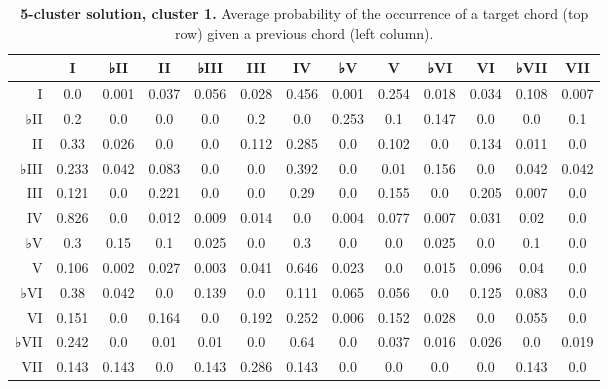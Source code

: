 \begin{table}[htbp]
\begin{minipage}{\linewidth}
\setlength{\tymax}{0.5\linewidth}
\centering
\small
\caption{\textbf{5-cluster solution, cluster 1.} Average probability of the occurrence of a target chord (top row) given a previous chord (left column).}
\label{5-clustersolutioncluster1.averageprobabilityoftheoccurrenceofatargetchordtoprowgivenapreviouschordleftcolumn.}
\begin{tabulary}{\textwidth}{@{}RCCCCCCCCCCCC@{}} \toprule
&I&♭II&II&♭III&III&IV&♭V&V&♭VI&VI&♭VII&VII\\
\midrule
I&0.0&0.001&0.037&0.056&0.028&0.456&0.001&0.254&0.018&0.034&0.108&0.007\\
♭II&0.2&0.0&0.0&0.0&0.2&0.0&0.253&0.1&0.147&0.0&0.0&0.1\\
II&0.33&0.026&0.0&0.0&0.112&0.285&0.0&0.102&0.0&0.134&0.011&0.0\\
♭III&0.233&0.042&0.083&0.0&0.0&0.392&0.0&0.01&0.156&0.0&0.042&0.042\\
III&0.121&0.0&0.221&0.0&0.0&0.29&0.0&0.155&0.0&0.205&0.007&0.0\\
IV&0.826&0.0&0.012&0.009&0.014&0.0&0.004&0.077&0.007&0.031&0.02&0.0\\
♭V&0.3&0.15&0.1&0.025&0.0&0.3&0.0&0.0&0.025&0.0&0.1&0.0\\
V&0.106&0.002&0.027&0.003&0.041&0.646&0.023&0.0&0.015&0.096&0.04&0.0\\
♭VI&0.38&0.042&0.0&0.139&0.0&0.111&0.065&0.056&0.0&0.125&0.083&0.0\\
VI&0.151&0.0&0.164&0.0&0.192&0.252&0.006&0.152&0.028&0.0&0.055&0.0\\
♭VII&0.242&0.0&0.01&0.01&0.0&0.64&0.0&0.037&0.016&0.026&0.0&0.019\\
VII&0.143&0.143&0.0&0.143&0.286&0.143&0.0&0.0&0.0&0.0&0.143&0.0\\

\bottomrule

\end{tabulary}
\end{minipage}
\end{table}

